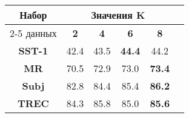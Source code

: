 \begin{minipage}{\linewidth}
\begin{center}
 \label{tab:title} 
\begin{tabular}{|c|c|c|c|c|c|}
\hline
\multirow{2}{*}{Набор}   &  \multicolumn{4}{c|}{Значения K} \\ \cline{2-5} 
     данных              &  \textbf{2}& \textbf{4}   & \textbf{6} & \textbf{8} \\ \hline
\textbf{SST-1}           & 42.4       & 43.5  & \textbf{44.4}     & 44.2     \\ \hline
\textbf{MR}              & 70.5       & 72.9  & 73.0     & \textbf{73.4}     \\ \hline
\textbf{Subj}            & 82.8       & 84.4  &  85.4             & \textbf{86.2} \\ \hline
\textbf{TREC}            & 84.3       & 85.8  & 85.0     & \textbf{85.6}     \\ \hline
\end{tabular}
\end{center}
\end{minipage}
\vspace{5mm}